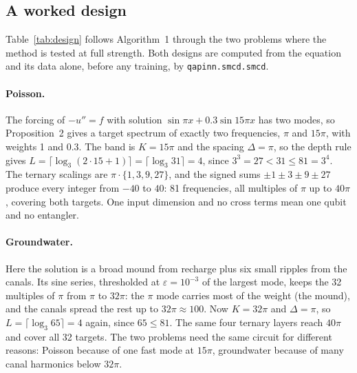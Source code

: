 \subsection{A worked design}
\label{sec:worked}

Table~\ref{tab:design} follows Algorithm~1 through the two problems where the method is
tested at full strength. Both designs are computed from the equation and its data alone,
before any training, by \texttt{qapinn.smcd.smcd}.

\paragraph{Poisson.} The forcing of $-u''=f$ with solution $\sin\pi x+0.3\sin15\pi x$ has
two modes, so Proposition~2 gives a target spectrum of exactly two frequencies, $\pi$ and
$15\pi$, with weights 1 and 0.3. The band is $K=15\pi$ and the spacing $\Delta=\pi$, so the
depth rule gives $L=\lceil\log_3(2\cdot15+1)\rceil=\lceil\log_3 31\rceil=4$, since
$3^3=27<31\le81=3^4$. The ternary scalings are $\pi\cdot\{1,3,9,27\}$, and the signed sums
$\pm1\pm3\pm9\pm27$ produce every integer from $-40$ to $40$: 81 frequencies, all multiples
of $\pi$ up to $40\pi$, covering both targets. One input dimension and no cross terms mean
one qubit and no entangler.

\paragraph{Groundwater.} Here the solution is a broad mound from recharge plus six small
ripples from the canals. Its sine series, thresholded at $\varepsilon=10^{-3}$ of the
largest mode, keeps the 32 multiples of $\pi$ from $\pi$ to $32\pi$: the $\pi$ mode carries
most of the weight (the mound), and the canals spread the rest up to $32\pi\approx100$.
Now $K=32\pi$ and $\Delta=\pi$, so $L=\lceil\log_3 65\rceil=4$ again, since $65\le81$. The
same four ternary layers reach $40\pi$ and cover all 32 targets. The two problems need the
same circuit for different reasons: Poisson because of one fast mode at $15\pi$,
groundwater because of many canal harmonics below $32\pi$.

